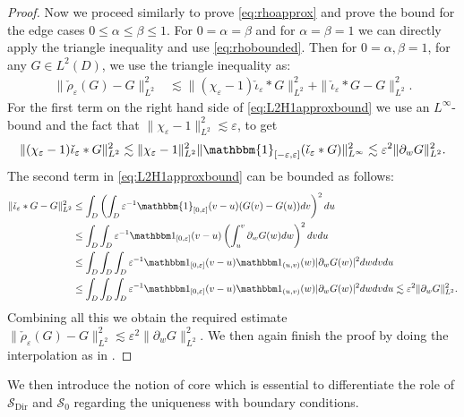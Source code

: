 \documentclass[a4paper, reqno, 12pt]{amsart}
\theoremstyle{plain}
\theoremstyle{definition}
\newcommand{\Sdir}{\mathcal{S}_{\text{Dir}}}
\begin{document}
\begin{proof}
Now we proceed similarly to prove \eqref{eq:rhoapprox} and prove the bound for the edge cases  $0\leq \alpha\leq \beta\leq 1$. For $0= \alpha  = \beta$ and for $\alpha = \beta = 1$ we can directly apply the triangle inequality and use \eqref{eq:rhobounded}. Then for $0 = \alpha, \beta=1$, for any $G\in L^2(D)$, we use the triangle inequality as:
    \begin{align}\label{eq:L2H1approxbound}
        \|\check\rho_{\varepsilon}(G) - G\|_{L^2}^2 &\lesssim \|(\chi_{\varepsilon} -1)\check \iota_{\varepsilon}\ast G\|^2_{L^2} + \|\check \iota_{\varepsilon} \ast G -G\| ^2_{L^2}.
    \end{align}
    For the first term on the right hand side of \eqref{eq:L2H1approxbound} we use an $L^{\infty}$-bound and the fact that  $\|\chi_\varepsilon -1\|^2_{L^2} \lesssim\varepsilon $, to get
    \begin{align*}
        \|(\chi_{\varepsilon} -1)\check \iota_{\varepsilon}\ast G\|^2_{L^2} \lesssim \|\chi_{\varepsilon}-1\|_{L^2}^2 \|\mathbbm{1}_{[-\varepsilon,\varepsilon]}(\check \iota_{\varepsilon}\ast G)\|^2_{L^{\infty}} \lesssim \varepsilon^2\|\partial_w G\|^2_{L^2}.
    \end{align*}
    The second term in \eqref{eq:L2H1approxbound} can be bounded as follows:
    \begin{align*}
        \|\check \iota_\varepsilon\ast G -G\|^2_{L^2}  &\leq \int_{D} \left(\int_{D} \varepsilon^{-1} \mathbbm{1}_{[0,\varepsilon]}(v-u)(G(v) - G(u)) dv \right)^2 du \\
        &\leq \int_{D} \int_{D} \varepsilon^{-1}\mathbbm 1_{[0,\varepsilon]}(v-u) \left( \int_u^v \partial_w G(w) dw\right)^2 dv du \\
        & \leq \int_{D} \int_{D} \int_{D} \varepsilon^{-1}\mathbbm 1_{[0,\varepsilon]}(v-u) \mathbbm 1_{(u,v)}(w) |\partial_w G(w)|^2 dw dv du \\
        & \leq \int_{D} \int_{D} \int_{D} \varepsilon^{-1}\mathbbm 1_{[0,\varepsilon]}(v-u) \mathbbm 1_{(u,v)}(w) |\partial_w G(w)|^2 dw dv du \lesssim \varepsilon^2\|\partial_w G\|^2_{L^2}.
    \end{align*}
    Combining all this we obtain the required estimate $\|\check\rho_{\varepsilon}(G) - G\|_{L^2}^2 \lesssim \varepsilon^2\|\partial_w G\|^2_{L^2}$.
    We then again finish the proof by doing the interpolation as in \cite{GPP24}.
\end{proof}


We then introduce the notion of core which is essential to differentiate the role of $\Sdir$ and $\mathcal S_0$ regarding the uniqueness with boundary conditions.
\end{document}
